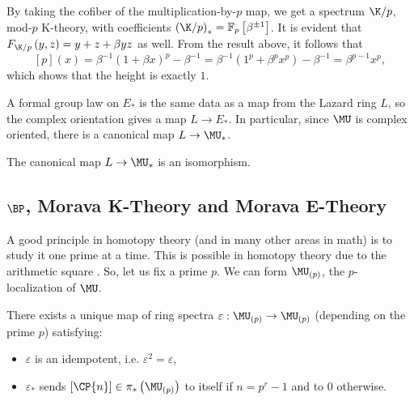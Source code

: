 
\begin{example}\label{k-thy-modp-height}
	By taking the cofiber of the multiplication-by-$p$ map, we get a spectrum $\K/p$, mod-$p$ K-theory, with coefficients $\left(\K/p\right)_* = \mathbb{F}_p \left[\beta^{\pm 1}\right]$.
	It is evident that $F_{\K/p}\left(y,z\right) = y + z + \beta y z$ as well.
	From the result above, it follows that
	$$
	\left[p\right]\left(x\right)
	= \beta^{-1} \left(1 + \beta x\right)^p - \beta^{-1}
	= \beta^{-1} \left(1^p + \beta^p x^p\right) - \beta^{-1}
	= \beta^{p-1} x^p,
	$$
	which shows that the height is exactly $1$.
\end{example}

A formal group law on $E_*$ is the same data as a map from the Lazard ring $L$, so the complex orientation gives a map $L \to E_*$.
In particular, since $\MU$ is complex oriented, there is a canonical map $L \to \MU_*$.

\begin{theorem}\label{quillen-theorem}
	The canonical map $L \to \MU_*$ is an isomorphism.
\end{theorem}




\subsection{\texorpdfstring{$\BP$}{BP}, Morava K-Theory and Morava E-Theory}

A good principle in homotopy theory (and in many other areas in math) is to study it one prime at a time.
This is possible in homotopy theory due to the arithmetic square .
So, let us fix a prime $p$.
We can form $\MU_{\left(p\right)}$, the $p$-localization of $\MU$.

\begin{theorem}
	There exists a unique map of ring spectra $\varepsilon: \MU_{\left(p\right)} \to \MU_{\left(p\right)}$ (depending on the prime $p$) satisfying:
	\begin{itemize}
		\item $\varepsilon$ is an idempotent, i.e. $\varepsilon^2 = \varepsilon$,
		\item $\varepsilon_*$ sends $\left[\CP{n}\right] \in \pi_*\left(\MU_{\left(p\right)}\right)$ to itself if $n = p^r-1$ and to $0$ otherwise.
	\end{itemize}
\end{theorem}

